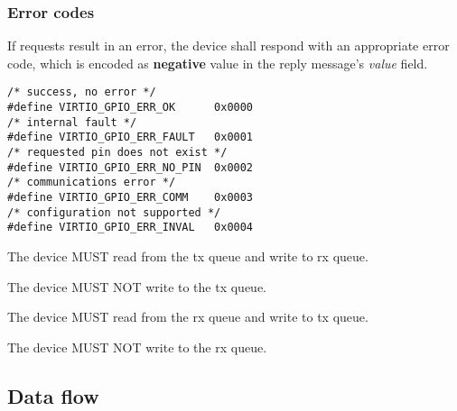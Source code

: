 \subsubsection{Error codes}\label{sec:Device Types / General Purpose IO / Virtqueues / Error codes}

If requests result in an error, the device shall respond with an appropriate
error code, which is encoded as \textbf{negative} value in the reply message's
\textit{value} field.

\begin{lstlisting}
/* success, no error */
#define VIRTIO_GPIO_ERR_OK      0x0000
/* internal fault */
#define VIRTIO_GPIO_ERR_FAULT   0x0001
/* requested pin does not exist */
#define VIRTIO_GPIO_ERR_NO_PIN  0x0002
/* communications error */
#define VIRTIO_GPIO_ERR_COMM    0x0003
/* configuration not supported */
#define VIRTIO_GPIO_ERR_INVAL   0x0004
\end{lstlisting}


The device MUST read from the tx queue and write to rx queue.

The device MUST NOT write to the tx queue.


The device MUST read from the rx queue and write to tx queue.

The device MUST NOT write to the rx queue.

\subsection{Data flow}\label{sec:Device Types / General Purpose IO / Data flow}

